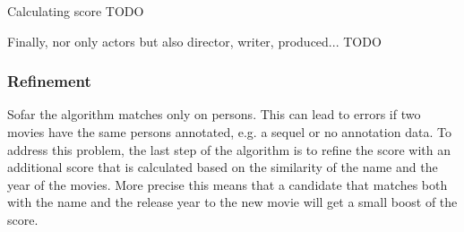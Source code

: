 Calculating score TODO

Finally, nor only actors but also director, writer, produced... TODO

\subsubsection{Refinement}
Sofar the algorithm matches only on persons. This can lead to errors if two movies have the same persons annotated, e.g. a sequel or no annotation data. To address this problem, the last step of the algorithm is to refine the score with an additional score that is calculated based on the similarity of the name and the year of the movies. More precise this means that a candidate that matches both with the name and the release year to the new movie will get a small boost of the score.

